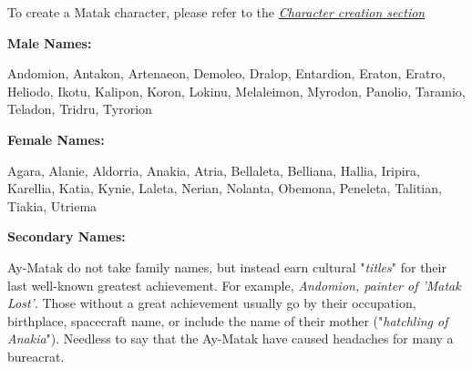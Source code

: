 To create a Matak character, please refer to the \textit{\hyperref[sec:rules-creation]{Character creation section}}

\textbf{Male Names:}

Andomion, Antakon, Artenaeon, Demoleo, Dralop, Entardion, Eraton, Eratro, Heliodo, Ikotu, Kalipon, Koron, Lokinu, Melaleimon, Myrodon, Panolio, Taramio, Teladon, Tridru, Tyrorion

\textbf{Female Names:}

Agara, Alanie, Aldorria, Anakia, Atria, Bellaleta, Belliana, Hallia, Iripira, Karellia, Katia, Kynie, Laleta, Nerian, Nolanta, Obemona, Peneleta, Talitian, Tiakia, Utriema

\textbf{Secondary Names:}

Ay-Matak do not take family names, but instead earn cultural "\textit{titles}" for their last well-known greatest achievement. For example, \textit{Andomion, painter of 'Matak Lost'}. Those without a great achievement usually go by their occupation, birthplace, spacecraft name, or include the name of their mother ("\textit{hatchling of Anakia}"). Needless to say that the Ay-Matak have caused headaches for many a bureacrat.
